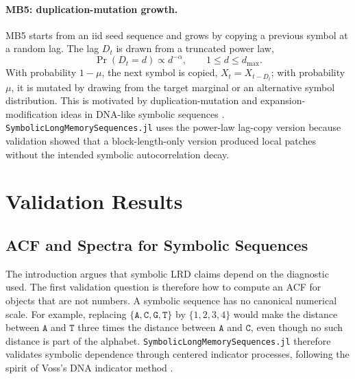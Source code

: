\documentclass[journal]{IEEEtran}
\newcommand{\pkg}[1]{\texttt{#1}}
\newcommand{\sfive}{\pkg{SymbolicLongMemorySequences.jl}}
\begin{document}
\paragraph{MB5: duplication-mutation growth.}
MB5 starts from an iid seed sequence and grows by copying a previous symbol at
a random lag. The lag $D_t$ is drawn from a truncated power law,
\begin{equation}
  \Pr(D_t=d) \propto d^{-\alpha},
  \qquad 1\le d\le d_{\max}.
\end{equation}
With probability $1-\mu$, the next symbol is copied,
$X_t=X_{t-D_t}$; with probability $\mu$, it is mutated by drawing from the
target marginal or an alternative symbol distribution. This is motivated by
duplication-mutation and expansion-modification ideas in DNA-like symbolic
sequences \cite{li1994_understanding,koroteev2015_duplication,salgado2012_exact}.
\sfive{} uses the power-law lag-copy version because validation showed that a
block-length-only version produced local patches without the intended symbolic
autocorrelation decay.

\section{Validation Results}
\label{sec:validation}

\subsection{ACF and Spectra for Symbolic Sequences}

The introduction argues that symbolic LRD claims depend on the diagnostic used.
The first validation question is therefore how to compute an ACF for objects that
are not numbers.  A symbolic sequence has no canonical numerical scale.  For example,
replacing
\(\{\mathtt{A},\mathtt{C},\mathtt{G},\mathtt{T}\}\) by \(\{1,2,3,4\}\) would make
the distance between \(\mathtt{A}\) and \(\mathtt{T}\) three times the distance
between \(\mathtt{A}\) and \(\mathtt{C}\), even though no such distance is part
of the alphabet. \sfive{} therefore validates symbolic dependence through centered
indicator processes, following the spirit of Voss's DNA indicator method
\cite{voss1992_evolution}.
\end{document}
